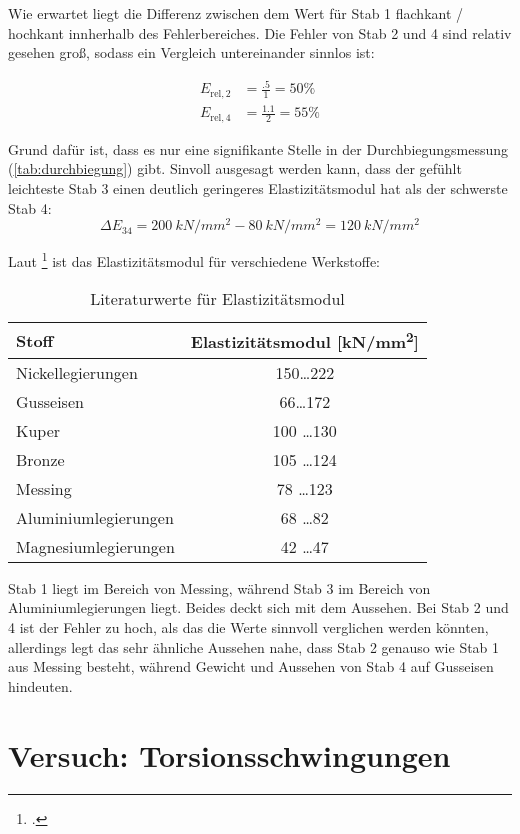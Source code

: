 Wie erwartet liegt die Differenz zwischen dem Wert für Stab 1 flachkant / hochkant innherhalb des Fehlerbereiches. Die Fehler von Stab 2 und 4 sind relativ gesehen groß, sodass ein Vergleich untereinander sinnlos ist:

\begin{align}
  E_{\text{rel}, 2}&=\frac{\num{.5}}{1}=50\% \\
  E_{\text{rel}, 4}&=\frac{\num{1.1}}{2}=55\%
  \label{eq:elastifehler}
\end{align}

Grund dafür ist, dass es nur eine signifikante Stelle in der Durchbiegungsmessung (\cref{tab:durchbiegung}) gibt.
Sinvoll ausgesagt werden kann, dass der gefühlt leichteste Stab 3 einen deutlich geringeres Elastizitätsmodul hat als der schwerste Stab 4:
\begin{equation}
  \Delta E_{34}=\SI{200}{kN/mm^2} - \SI{80}{kN/mm^2}=\SI{120}{kN/mm^2}
  \label{eq:elastidiff34}
\end{equation}

Laut \footcite{ingenieurwissen} ist das Elastizitätsmodul für verschiedene Werkstoffe:

\begin{table}[H]
  \centering
  \begin{tabular}{l | c}
    Stoff & Elastizitätsmodul [\si{kN/mm^2}] \\ \hline
    Nickellegierungen & 150\ldots 222 \\
    Gusseisen & 66\ldots 172 \\
    Kuper & 100 \ldots 130 \\
    Bronze & 105 \ldots 124 \\
    Messing & 78 \ldots 123 \\
    Aluminiumlegierungen & 68 \ldots 82 \\
    Magnesiumlegierungen & 42 \ldots 47
  \end{tabular}
  \caption{Literaturwerte für Elastizitätsmodul}
  \label{tab:litwertelasti}
\end{table}

Stab 1 liegt im Bereich von Messing, während Stab 3 im Bereich von Aluminiumlegierungen liegt. Beides deckt sich mit dem Aussehen. Bei Stab 2 und 4 ist der Fehler zu hoch, als das die Werte sinnvoll verglichen werden könnten, allerdings legt das sehr ähnliche Aussehen nahe, dass Stab 2 genauso wie Stab 1 aus Messing besteht, während Gewicht und Aussehen von Stab 4 auf Gusseisen hindeuten.
\section{Versuch: Torsionsschwingungen}
